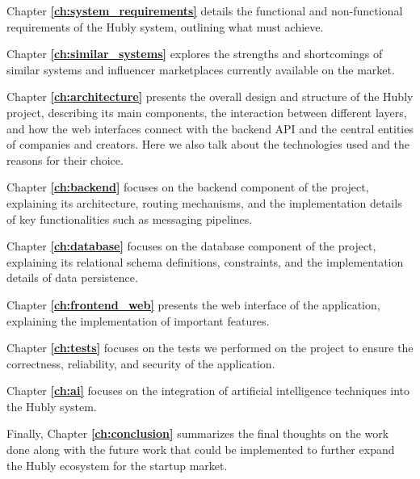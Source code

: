 Chapter \textbf{\ref{ch:system_requirements}} details the functional and non-functional requirements of the Hubly system, outlining what must achieve.

Chapter \textbf{\ref{ch:similar_systems}} explores the strengths and shortcomings of similar systems and influencer marketplaces currently available on the market.

Chapter \textbf{\ref{ch:architecture}} presents the overall design and structure of the Hubly project, describing its main components, the interaction between different layers, and how the web interfaces connect with the backend API and the central entities of companies and creators. Here we also talk about the technologies used and the reasons for their choice.

Chapter \textbf{\ref{ch:backend}} focuses on the backend component of the project, explaining its architecture, routing mechanisms, and the implementation details of key functionalities such as messaging pipelines.

Chapter \textbf{\ref{ch:database}} focuses on the database component of the project, explaining its relational schema definitions, constraints, and the implementation details of data persistence.

Chapter \textbf{\ref{ch:frontend_web}} presents the web interface of the application, explaining the implementation of important features.

Chapter \textbf{\ref{ch:tests}} focuses on the tests we performed on the project to ensure the correctness, reliability, and security of the application.

Chapter \textbf{\ref{ch:ai}} focuses on the integration of artificial intelligence techniques into the Hubly system.

Finally, Chapter \textbf{\ref{ch:conclusion}} summarizes the final thoughts on the work done along with the future work that could be implemented to further expand the Hubly ecosystem for the startup market.